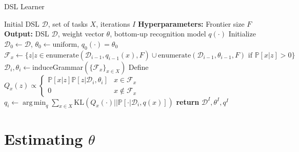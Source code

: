\documentclass{article}
\DeclareMathOperator*{\argmin}{arg\,min} %
\DeclareMathOperator{\argmin}{argmin} %
\newcommand{\probability}{\mathds{P}} %
\begin{document}
\begin{algorithm}[tb]
   \caption{DSL Learner}
   \label{mainAlgorithm}
   \begin{algorithmic}
      Initial DSL $\mathcal{D}$, set of tasks $X$, iterations $I$
     \STATE \textbf{Hyperparameters:} Frontier size $F$
     \STATE \textbf{Output:} DSL $\mathcal{D}$, weight vector $\theta$, bottom-up recognition model $q(\cdot)$
     \STATE Initialize $\mathcal{D}_0\gets \mathcal{D}$, $\theta_0\gets \text{uniform}$, $q_0(\cdot ) = \theta_0$
     \STATE  $\mathcal{F}_x\gets \{z| z\in \text{enumerate}(\mathcal{D}_{i - 1},q_{i - 1}(x),F)\cup\text{enumerate}(\mathcal{D}_{i - 1},\theta_{i - 1},F) \text{ if }\probability[x|z] > 0\}$
     \ENDFOR
     \STATE $\mathcal{D}_i,\theta_i\gets $induceGrammar$(\{\mathcal{F}_x\}_{x\in X})$
     \STATE Define $Q_x(z) \propto \begin{cases}
       \probability[x|z]\probability[z|\mathcal{D}_i,\theta_i]&x\in \mathcal{F}_x\\
       0&x\not \in \mathcal{F}_x
     \end{cases}$
     \STATE $q_i\gets \argmin_q \sum_{x\in X}\text{KL}(Q_x(\cdot )||\probability[\cdot |\mathcal{D}_i,q(x)])$
      \ENDFOR
 \STATE \textbf{return} $\mathcal{D}^I,\theta^I,q^I$
\end{algorithmic}
\end{algorithm}



\section{Estimating $\theta$}
\end{document}
